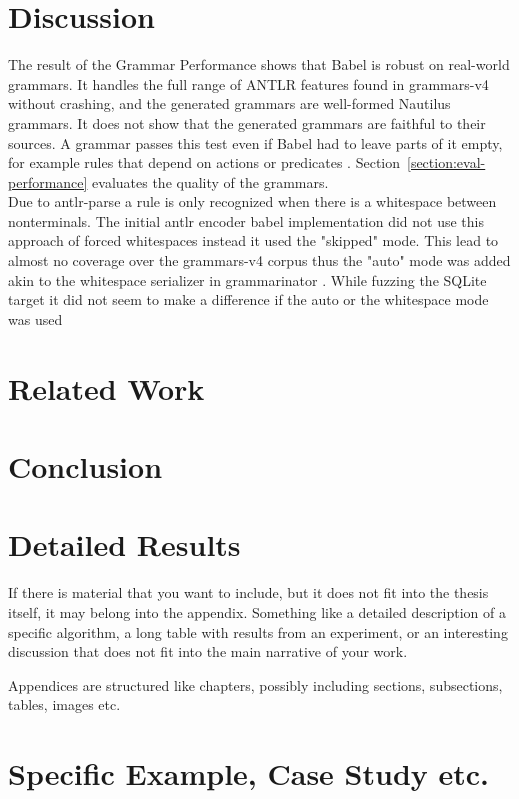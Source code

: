 \documentclass[thesis]{plai}
\begin{document}
\chapter{Discussion}
\label{chapter:discussion}
The result of the Grammar Performance shows that Babel is robust on real-world grammars. It handles the full range of ANTLR features found in grammars-v4 without crashing, and the generated grammars are well-formed Nautilus grammars. It does not show that the generated grammars are faithful to their sources. A grammar passes this test even if Babel had to leave parts of it empty, for example rules that depend on actions or predicates . Section~\ref{section:eval-performance} evaluates the quality of the grammars. \\
Due to antlr-parse a rule is only recognized when there is a whitespace between nonterminals. The initial antlr encoder babel implementation did not use this approach of forced whitespaces instead it used the "skipped" mode. This lead to almost no coverage over the grammars-v4 corpus thus the "auto" mode was added akin to the whitespace serializer in grammarinator \cite{grammarinator-github}. While fuzzing the SQLite target it did not seem to make a difference if the auto or the whitespace mode was used %
\chapter{Related Work}
\label{chapter:related-work}

\chapter{Conclusion}
\label{chapter:conclusion}





\appendix

\chapter{Detailed Results}

If there is material that you want to include, but it does not fit into the thesis itself, it may belong into the appendix.
Something like a detailed description of a specific algorithm, a long table with results from an experiment, or an interesting discussion that does not fit into the main narrative of your work.

Appendices are structured like chapters, possibly including sections, subsections, tables, images etc.

\chapter{Specific Example, Case Study etc.}
\end{document}

